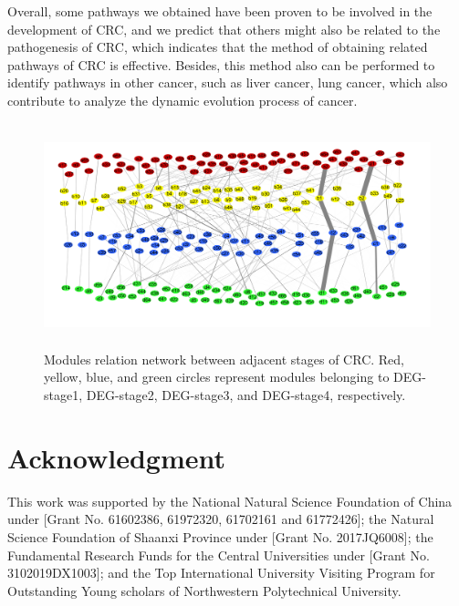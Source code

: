 \documentclass[conference]{IEEEtran}
\begin{document}
Overall, some pathways we obtained have been proven to be involved in the development of CRC, and we predict that others might also be related to the pathogenesis of CRC, which indicates that the method of obtaining related pathways of CRC is effective. Besides, this method also can be performed to identify pathways in other cancer, such as liver cancer, lung cancer, which also contribute to analyze the dynamic evolution process of cancer. 

\begin{figure}[htbp]
	\centering
	\includegraphics[width = .9\textwidth,height=6.5cm]{FIG/fig3.png}
	\caption{Modules relation network between adjacent stages of CRC. Red, yellow, blue, and green circles represent modules belonging to DEG-stage1, DEG-stage2, DEG-stage3, and DEG-stage4, respectively.}
	\label{Fig3}
\end{figure}

\section*{Acknowledgment}
This work was supported by the National Natural Science Foundation of China under [Grant No. 61602386, 61972320, 61702161 and 61772426]; 
the Natural Science Foundation of Shaanxi Province under [Grant No. 2017JQ6008]; 
the Fundamental Research Funds for the Central Universities under [Grant No. 3102019DX1003];  
and the Top International University Visiting Program for Outstanding Young scholars of Northwestern Polytechnical University.




\end{document}
